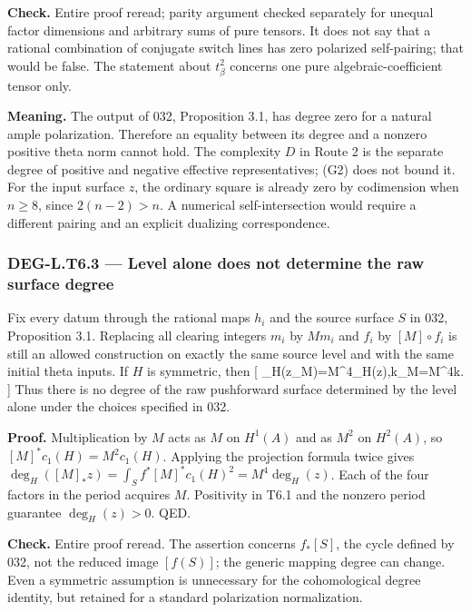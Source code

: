 \documentclass[11pt,a4paper]{article}
\theoremstyle{definition}
\begin{document}
\textbf{Check.} Entire proof reread; parity argument checked separately
for unequal factor dimensions and arbitrary sums of pure tensors. It
does not say that a rational combination of conjugate switch lines has
zero polarized self-pairing; that would be false. The statement about
\(t_\beta^2\) concerns one pure algebraic-coefficient tensor only.

\textbf{Meaning.} The output of 032, Proposition 3.1, has degree zero
for a natural ample polarization. Therefore an equality between its
degree and a nonzero positive theta norm cannot hold. The complexity
\(D\) in Route 2 is the separate degree of positive and negative
effective representatives; (G2) does not bound it. For the input surface
\(z\), the ordinary square is already zero by codimension when
\(n\ge8\), since \(2(n-2)>n\). A numerical self-intersection would
require a different pairing and an explicit dualizing correspondence.

\subsubsection{DEG-L.T6.3 --- Level alone does not determine the raw
surface
degree}\label{deg-l.t6.3-level-alone-does-not-determine-the-raw-surface-degree}

Fix every datum through the rational maps \(h_i\) and the source surface
\(S\) in 032, Proposition 3.1. Replacing all clearing integers \(m_i\)
by \(Mm_i\) and \(f_i\) by \([M]\circ f_i\) is still an allowed
construction on exactly the same source level and with the same initial
theta inputs. If \(H\) is symmetric, then {[}
\deg\_H(z\_M)=M\^{}4\deg\_H(z),\qquad k\_M=M\^{}4k.  {]} Thus
there is no degree of the raw pushforward surface determined by the
level alone under the choices specified in 032.

\textbf{Proof.} Multiplication by \(M\) acts as \(M\) on \(H^1(A)\) and
as \(M^2\) on \(H^2(A)\), so \([M]^*c_1(H)=M^2c_1(H)\). Applying the
projection formula twice gives
\(\deg_H([M]_*z)=\int_S f^*[M]^*c_1(H)^2=M^4\deg_H(z)\). Each of the
four factors in the period acquires \(M\). Positivity in T6.1 and the
nonzero period guarantee \(\deg_H(z)>0\). QED.

\textbf{Check.} Entire proof reread. The assertion concerns \(f_*[S]\),
the cycle defined by 032, not the reduced image \([f(S)]\); the generic
mapping degree can change. Even a symmetric assumption is unnecessary
for the cohomological degree identity, but retained for a standard
polarization normalization.
\end{document}
